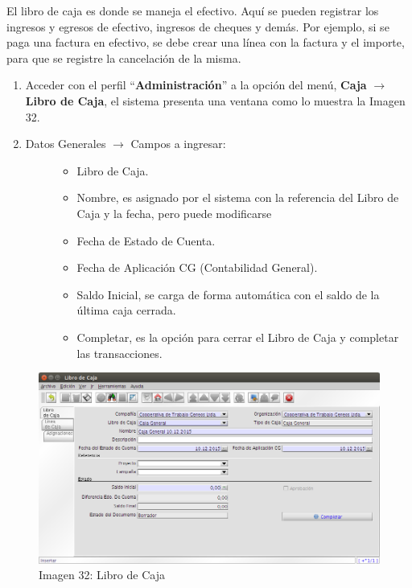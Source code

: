 \documentclass[letterpaper,10pt,spanish]{sphinxmanual}
\begin{document}
El libro de caja es donde se maneja el efectivo. Aquí se pueden registrar los ingresos y egresos de efectivo, ingresos de cheques y demás. Por ejemplo, si se paga una factura en efectivo, se debe crear una línea con la factura y el importe, para que se registre la cancelación de la misma.
\begin{enumerate}
\item {} 
Acceder con el perfil ``\textbf{Administración}'' a la opción del menú, \textbf{Caja} \(\rightarrow\)  \textbf{Libro de Caja}, el sistema presenta una ventana como lo muestra la Imagen 32.

\item {} \begin{description}
\item[{Datos Generales \(\rightarrow\) Campos a ingresar:}] \leavevmode\begin{itemize}
\item {} 
Libro de Caja.

\item {} 
Nombre, es asignado por el sistema con la referencia del Libro de Caja y la fecha, pero puede modificarse

\item {} 
Fecha de Estado de Cuenta.

\item {} 
Fecha de Aplicación CG (Contabilidad General).

\item {} 
Saldo Inicial, se carga de forma automática con el saldo de la última caja cerrada.

\item {} 
Completar, es la opción para cerrar el Libro de Caja y completar las transacciones.

\end{itemize}

\end{description}

\end{enumerate}
\begin{figure}[htbp]
\centering
\capstart

\includegraphics{ly_cajas_32.png}
\caption{Imagen 32: Libro de Caja}\end{figure}
\end{document}
